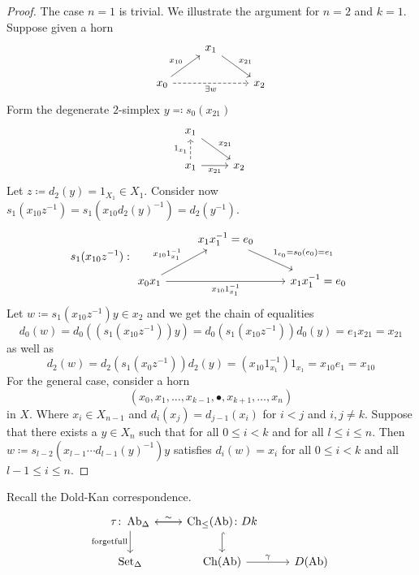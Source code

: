 \begin{proof}
    The case $n=1$ is trivial.
    We illustrate the argument for $n=2$ and $k=1$.
    Suppose given a horn 
    \[
    \begin{tikzcd}
        &
        x_1
        \arrow[rd, "x_{21}"]
        & \\
        x_0
        \arrow[ru, "x_{10}"]
        \arrow[rr, dashed, "\exists w"']
        &&
        x_2
    \end{tikzcd}
    \]
    Form the degenerate $2$-simplex $y \eqqcolon s_0(x_{21})$
    \[
    \begin{tikzcd}
        x_1
        \arrow[rd, "x_{21}"]
        &
        \\
        x_1
        \arrow[u, dashed, "1_{x_1}"]
        \arrow[r, "x_{21}"']
        &
        x_2
    \end{tikzcd}
    \]
    Let $z \coloneqq d_2(y) = 1_{X_1} \in X_1$.
    Consider now $s_1(x_{10}z^{-1})=s_1(x_{10}d_2(y)^{-1})=d_2(y^{-1})$.
    \[
    s_1(x_{10}z^{-1}):
    \begin{tikzcd}
        &
        x_1x_1^{-1}=e_0
        \arrow[rd, "1_{e_0}=s_0(e_0)=e_1"]
        &
        \\
        x_0x_1
        \arrow[ru, "x_{10}1_{x_1}^{-1}"]
        \arrow[rr, "x_{10}1_{x_1}^{-1}"']
        &&
        x_1x_1^{-1}=e_0
    \end{tikzcd}
    \]
    Let $w \coloneqq s_1(x_{10}z^{-1})y\in x_2$ and we get the chain of equalities
    \[
        d_0(w)=d_0((s_1(x_{10}z^{-1}))y)=d_0(s_1(x_{10}z^{-1}))d_0(y)=e_1x_{21}=x_{21}
    \]
    as well as 
    \[
    d_2(w)=d_2(s_1(x_0z^{-1}))d_2(y)=(x_{10}1_{x_1}^{-1})1_{x_1}=x_{10}e_1=x_{10}
    \]
    For the general case, consider a horn 
    \[
    (x_0,x_1,\dotsc, x_{k-1},\bullet,x_{k+1},\dotsc,x_n) 
    \]
    in $X$. Where $x_i \in X_{n-1}$ and $ d_i(x_j)=d_{j-1}(x_i)$ for $i<j$ and $i,j \neq k$.
    Suppose that there exists a $y \in X_n$ such that for all $ 0 \leq i < k$ and for all $l \leq i \leq n$.
    Then $w \coloneqq s_{l-2}(x_{l-1}\dotsm d_{l-1}(y)^{-1})y$ satisfies $d_i(w)=x_i$ for all $0 \leq i <k$ and all $l-1\leq i \leq n$.
\end{proof}

Recall the Dold-Kan correspondence.
\[
\begin{tikzcd}
    \tau \colon \Ab_{\Delta}
    \arrow[d, "\text{forgetfull}"']
    \arrow[r,"\sim"]
    &
    \Ch_{\leq} (\Ab)\colon Dk
    \arrow[l]
    \arrow[d, hook]
    &
    \\
    \SetD
    &
    \Ch(\Ab)
    \arrow[r,"\gamma"]
    &
    D(\Ab)
\end{tikzcd}
\]

